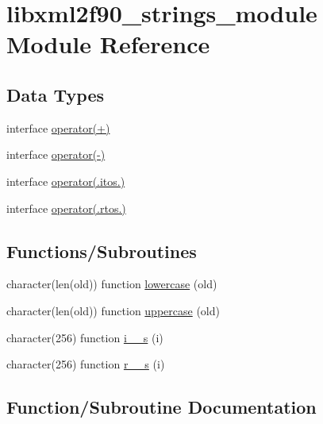 \hypertarget{namespacelibxml2f90__strings__module}{}\section{libxml2f90\+\_\+strings\+\_\+module Module Reference}
\label{namespacelibxml2f90__strings__module}
\subsection*{Data Types}
\begin{DoxyCompactItemize}
\item 
interface \hyperlink{interfacelibxml2f90__strings__module_1_1operator_07_09_08}{operator(+)}
\item 
interface \hyperlink{interfacelibxml2f90__strings__module_1_1operator_07-_08}{operator(-\/)}
\item 
interface \hyperlink{interfacelibxml2f90__strings__module_1_1operator_07_8itos_8_08}{operator(.\+itos.)}
\item 
interface \hyperlink{interfacelibxml2f90__strings__module_1_1operator_07_8rtos_8_08}{operator(.\+rtos.)}
\end{DoxyCompactItemize}
\subsection*{Functions/\+Subroutines}
\begin{DoxyCompactItemize}
\item 
character(len(old)) function \hyperlink{namespacelibxml2f90__strings__module_a4e91e2d759dc3546b64d31ee3d35e2e7}{lowercase} (old)
\item 
character(len(old)) function \hyperlink{namespacelibxml2f90__strings__module_a9793dff5114e7403d7f95c0b8f493e1d}{uppercase} (old)
\item 
character(256) function \hyperlink{namespacelibxml2f90__strings__module_a1ae9fdac593cf7dfb1239930b06f7151}{i\+\_\+\_\+s} (i)
\item 
character(256) function \hyperlink{namespacelibxml2f90__strings__module_a3e162b5f18f39c8769659ce67d2357a4}{r\+\_\+\_\+s} (i)
\end{DoxyCompactItemize}


\subsection{Function/\+Subroutine Documentation}
\mbox{\label{namespacelibxml2f90__strings__module_a1ae9fdac593cf7dfb1239930b06f7151}} 
